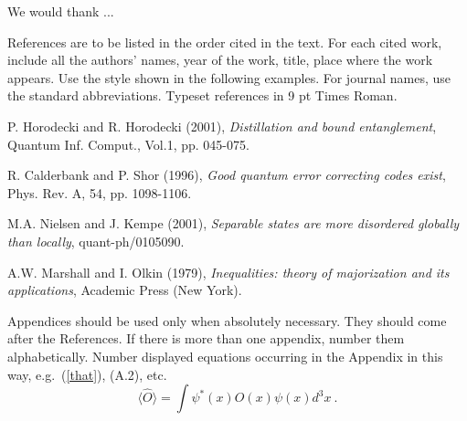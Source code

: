 \documentclass[twoside]{article}
\begin{document}
\noindent
We would thank ...

\noindent
References are to be listed in the order cited in the text.
For each cited work, include all the authors' names, year of the work, title,
place where the work appears.
Use the style shown in the following examples. For journal names,
use the standard abbreviations. Typeset references in 9 pt Times
Roman.

\begin{thebibliography}{000}
P. Horodecki and R. Horodecki (2001), {\it Distillation and bound entanglement},
Quantum Inf. Comput., Vol.1, pp. 045-075.

R. Calderbank and P. Shor (1996), {\it Good quantum error
       correcting codes exist},
Phys. Rev. A, 54, pp. 1098-1106.

M.A. Nielsen and J. Kempe (2001), {\it Separable states are
more disordered globally than locally}, quant-ph/0105090.

A.W. Marshall and I. Olkin (1979), {\it Inequalities: theory of majorization and its applications},
Academic Press (New York).
\end{thebibliography}

\appendix

\noindent
Appendices should be used only when absolutely necessary. They
should come after the References. If there is more than one
appendix, number them alphabetically. Number displayed equations
occurring in the Appendix in this way, e.g.~(\ref{that}), (A.2),
etc.
\begin{equation}
\langle\hat{O}\rangle=\int\psi^*(x)O(x)\psi(x)d^3x~. 
\label{that}
\end{equation}
\end{document}
